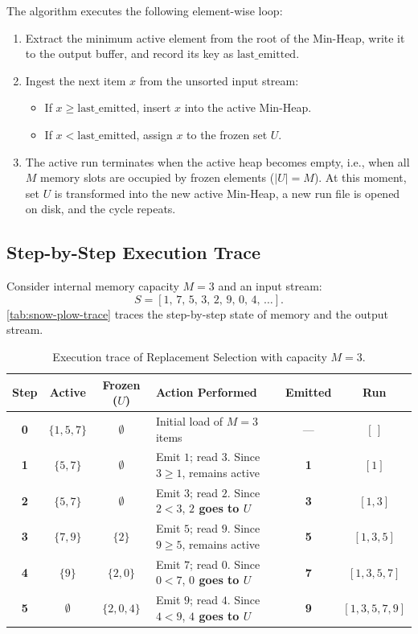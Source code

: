 The algorithm executes the following element-wise loop:
\begin{enumerate}
  \item Extract the minimum active element from the root of the Min-Heap, write it to the output buffer, and record its key as $\text{last\_emitted}$.
  \item Ingest the next item $x$ from the unsorted input stream:
  \begin{itemize}
    \item If $x \ge \text{last\_emitted}$, insert $x$ into the active Min-Heap.
    \item If $x < \text{last\_emitted}$, assign $x$ to the frozen set $U$.
  \end{itemize}
  \item The active run terminates when the active heap becomes empty, i.e., when all $M$ memory slots are occupied by frozen elements ($\vert{}U\vert{} = M$). At this moment, set $U$ is transformed into the new active Min-Heap, a new run file is opened on disk, and the cycle repeats.
\end{enumerate}

\subsection{Step-by-Step Execution Trace}
\label{subsec:snow-plow-trace}

Consider internal memory capacity $M = 3$ and an input stream:
\[
  S = [1, \, 7, \, 5, \, 3, \, 2, \, 9, \, 0, \, 4, \, \dots].
\]
\autoref{tab:snow-plow-trace} traces the step-by-step state of memory and the output stream.

\begin{table}[H]
  \centering
  \caption{Execution trace of Replacement Selection with capacity $M=3$.}
  \label{tab:snow-plow-trace}
  \small
  \setlength{\tabcolsep}{4pt}
  \begin{tabularx}{\textwidth}{c c c Y c c}
    \toprule
    \textbf{Step} & \textbf{Active} & \textbf{Frozen ($U$)} & \textbf{Action Performed} & \textbf{Emitted} & \textbf{Run} \\
    \midrule
    \textbf{0} & $\{1, 5, 7\}$ & $\emptyset$ & Initial load of $M=3$ items & — & $[\,]$ \\
    \textbf{1} & $\{5, 7\}$ & $\emptyset$ & Emit $1$; read $3$. Since $3 \ge 1$, remains active & \textbf{1} & $[1]$ \\
    \textbf{2} & $\{5, 7\}$ & $\emptyset$ & Emit $3$; read $2$. Since $2 < 3$, \textbf{$2$ goes to $U$} & \textbf{3} & $[1, 3]$ \\
    \textbf{3} & $\{7, 9\}$ & $\{2\}$ & Emit $5$; read $9$. Since $9 \ge 5$, remains active & \textbf{5} & $[1, 3, 5]$ \\
    \textbf{4} & $\{9\}$ & $\{2, 0\}$ & Emit $7$; read $0$. Since $0 < 7$, \textbf{$0$ goes to $U$} & \textbf{7} & $[1, 3, 5, 7]$ \\
    \textbf{5} & $\emptyset$ & $\{2, 0, 4\}$ & Emit $9$; read $4$. Since $4 < 9$, \textbf{$4$ goes to $U$} & \textbf{9} & $[1, 3, 5, 7, 9]$ \\
    \bottomrule
  \end{tabularx}
\end{table}

